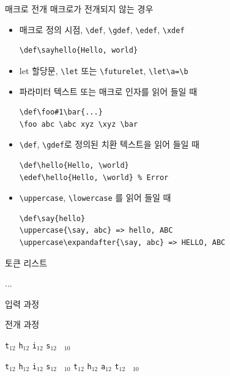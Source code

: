 \documentclass{beamer}
\begin{document}
%
\begin{frame}[fragile]{매크로 전개}
  매크로가 전개되지 않는 경우
  \begin{itemize}
  \item 매크로 정의 시점, \verb+\def+, \verb+\gdef+, \verb+\edef+, \verb+\xdef+
\begin{Verbatim}[fontsize=\small, formatcom=\color{blue}]
\def\sayhello{Hello, world}
\end{Verbatim}
  \item let 할당문, \verb+\let+ 또는 \verb+\futurelet+,
  {\color{blue} \verb+\let\a=\b+}
  \item 파라미터 텍스트 또는 매크로 인자를 읽어 들일 때
\begin{Verbatim}[fontsize=\small, formatcom=\color{blue}]
\def\foo#1\bar{...}
\foo abc \abc xyz \xyz \bar
\end{Verbatim}
  \item \verb+\def+, \verb+\gdef+로 정의된 치환 텍스트을 읽어 들일 때
\begin{Verbatim}[fontsize=\small, formatcom=\color{blue}] 
\def\hello{Hello, \world}
\edef\hello{Hello, \world} % Error
\end{Verbatim}
  \item \verb+\uppercase+, \verb+\lowercase+ 를 읽어 들일 때
\begin{Verbatim}[fontsize=\small, formatcom=\color{blue}]
\def\say{hello}
\uppercase{\say, abc} => hello, ABC
\uppercase\expandafter{\say, abc} => HELLO, ABC  
\end{Verbatim}
  \end{itemize}
\end{frame}


%
\begin{frame}[fragile]{토큰 리스트}
  \begin{Verbatim*}
\def\tokentwo{\iftrue this \else that \fi}
\def\tokenone#1{...}
...
\expandafter\tokenone\tokentwo
  \end{Verbatim*}
  \bigskip

  \alert{입력 과정}
  
  \quad
  \quad
  
  \bigskip
  \alert{전개 과정}
  
  \quad
  \verb|t|$_{12}$\quad
  \verb|h|$_{12}$\quad
  \verb|i|$_{12}$\quad
  \verb|s|$_{12}$\quad
  \verb*| |$_{10}$
  
  \bigskip
  \quad
  \quad
  \verb|t|$_{12}$\quad
  \verb|h|$_{12}$\quad
  \verb|i|$_{12}$\quad
  \verb|s|$_{12}$\quad
  \verb*| |$_{10}$\quad
  \quad
  \verb|t|$_{12}$\quad
  \verb|h|$_{12}$\quad
  \verb|a|$_{12}$\quad
  \verb|t|$_{12}$\quad
  \verb*| |$_{10}$\quad
\end{frame}
\end{document}
